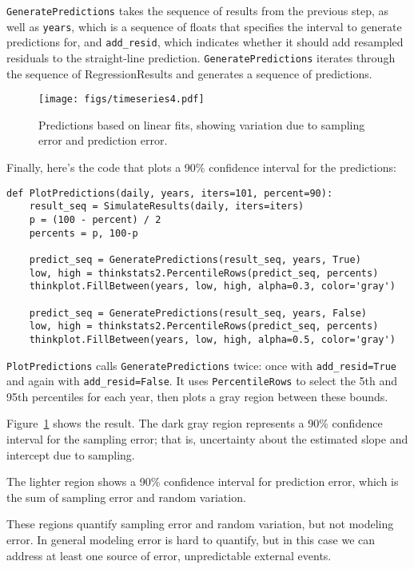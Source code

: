 \documentclass[12pt]{book}
\begin{document}
{\tt GeneratePredictions} takes the sequence of results from the
previous step, as well as {\tt years}, which is a sequence of
floats that specifies the interval to generate predictions for,
and \verb"add_resid", which indicates whether it should add resampled
residuals to the straight-line prediction.
{\tt GeneratePredictions} iterates through the sequence of
RegressionResults and generates a sequence of predictions.

\begin{figure}
\centerline{\texttt{[image: figs/timeseries4.pdf]}}
\caption{Predictions based on linear fits, showing variation due
to sampling error and prediction error.}
\label{timeseries4}
\end{figure}

Finally, here's the code that plots a 90\% confidence interval for
the predictions:

\begin{verbatim}
def PlotPredictions(daily, years, iters=101, percent=90):
    result_seq = SimulateResults(daily, iters=iters)
    p = (100 - percent) / 2
    percents = p, 100-p

    predict_seq = GeneratePredictions(result_seq, years, True)
    low, high = thinkstats2.PercentileRows(predict_seq, percents)
    thinkplot.FillBetween(years, low, high, alpha=0.3, color='gray')

    predict_seq = GeneratePredictions(result_seq, years, False)
    low, high = thinkstats2.PercentileRows(predict_seq, percents)
    thinkplot.FillBetween(years, low, high, alpha=0.5, color='gray')
\end{verbatim}

{\tt PlotPredictions} calls {\tt GeneratePredictions} twice: once
with \verb"add_resid=True" and again with \verb"add_resid=False".
It uses {\tt PercentileRows} to select the 5th and 95th percentiles
for each year, then plots a gray region between these bounds.

Figure~\ref{timeseries4} shows the result.
The dark gray region represents a 90\% confidence interval for
the sampling error; that is, uncertainty about the estimated
slope and intercept due to sampling.

The lighter region shows
a 90\% confidence interval for prediction error, which is the
sum of sampling error and random variation.

These regions quantify sampling error and random variation, but
not modeling error.  In general modeling error is hard to quantify,
but in this case we can address at least one source of error,
unpredictable external events.
\end{document}
